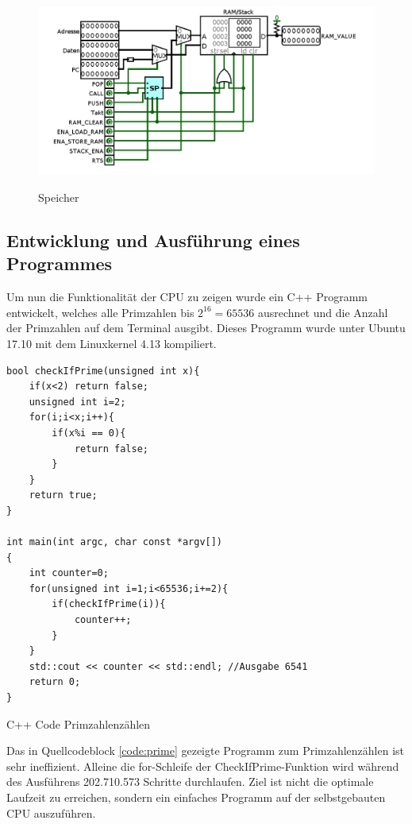 \documentclass[12pt]{article}
\begin{document}
\newpage

\begin{figure}[!hp]
\includegraphics[scale=0.45]{ram}
\centering
\label{fig:register}
\caption{Speicher}
\end{figure}
\newpage

\subsection{Entwicklung und Ausführung eines Programmes}
Um nun die Funktionalität der CPU zu zeigen wurde ein C++ Programm entwickelt, welches alle Primzahlen bis $2^{16} = 65536$ ausrechnet und die Anzahl der Primzahlen auf dem Terminal ausgibt. Dieses Programm wurde unter Ubuntu 17.10 mit dem Linuxkernel 4.13 kompiliert.

\begin{code}[!htb]
\begin{lstlisting}
bool checkIfPrime(unsigned int x){
	if(x<2) return false;
	unsigned int i=2;
	for(i;i<x;i++){
		if(x%i == 0){
			return false;
		}
	}
	return true;
}

int main(int argc, char const *argv[])
{
	int counter=0;
	for(unsigned int i=1;i<65536;i+=2){
		if(checkIfPrime(i)){
			counter++;
		}
	}
	std::cout << counter << std::endl; //Ausgabe 6541
	return 0;
}
\end{lstlisting}
\caption[C++ Code Primzahlenzählen]{C++ Code Primzahlenzählen}
\label{code:prime}
\end{code}

\noindent Das in Quellcodeblock \ref{code:prime} gezeigte Programm zum Primzahlenzählen ist sehr ineffizient. Alleine die for-Schleife der CheckIfPrime-Funktion wird während des Ausführens 202.710.573 Schritte durchlaufen. Ziel ist nicht die optimale Laufzeit zu erreichen, sondern ein einfaches Programm auf der selbstgebauten CPU auszuführen.
\end{document}
